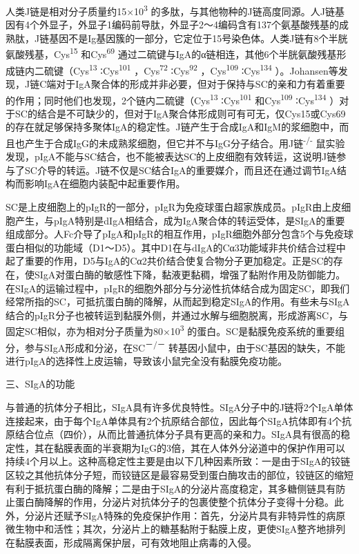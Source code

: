 人类J链是相对分子质量约15×10\textsuperscript{3}
的多肽，与其他物种的J链高度同源。人J链基因有4个外显子，外显子1编码前导肽，外显子2～4编码含有137个氨基酸残基的成熟肽，J链基因不是Ig基因簇的一部分，它定位于15号染色体。人类J链有8个半胱氨酸残基，Cys\textsuperscript{15}
和Cys\textsuperscript{69}
通过二硫键与IgA的α链相连，其他6个半胱氨酸残基形成链内二硫键（Cys\textsuperscript{13}
∶Cys\textsuperscript{101} ，Cys\textsuperscript{72}
∶Cys\textsuperscript{92} ，Cys\textsuperscript{109}
∶Cys\textsuperscript{134}
）。Johansen等发现，J链C端对于IgA聚合体的形成并非必要，但对于保持与SC的亲和力有着重要的作用；同时他们也发现，2个链内二硫键（Cys\textsuperscript{13}
∶Cys\textsuperscript{101} 和Cys\textsuperscript{109}
∶Cys\textsuperscript{134}
）对于SC的结合是不可缺少的，但对于IgA聚合体形成则可有可无，仅Cys15或Cys69的存在就足够保持多聚体IgA的稳定性。J链产生于合成IgA和IgM的浆细胞中，而且也产生于合成IgG的未成熟浆细胞，但它并不与IgG分子结合。用J链\textsuperscript{-/-}
鼠实验发现，pIgA不能与SC结合，也不能被表达SC的上皮细胞有效转运，这说明J链参与了SC介导的转运。J链不仅是SC结合IgA的重要媒介，而且还在通过调节IgA结构而影响IgA在细胞内装配中起重要作用。

SC是上皮细胞上的pIgR的一部分，pIgR为免疫球蛋白超家族成员。pIgR由上皮细胞产生，与pIgA特别是dIgA相结合，成为IgA聚合体的转运受体，是SIgA的重要组成部分。人Fc介导了pIgA和pIgR的相互作用，pIgR细胞外部分包含5个与免疫球蛋白相似的功能域（D1～D5）。其中D1在与dIgA的Cα3功能域非共价结合过程中起了重要的作用，D5与IgA的Cα2共价结合使复合物分子更加稳定。正是SC的存在，使SIgA对蛋白酶的敏感性下降，黏液更黏稠，增强了黏附作用及防御能力。在SIgA的运输过程中，pIgR的细胞外部分与分泌性抗体结合成为固定SC，即我们经常所指的SC，可抵抗蛋白酶的降解，从而起到稳定SIgA的作用。有些未与SIgA结合的pIgR分子也被转运到黏膜外侧，并通过水解与细胞脱离，形成游离SC，与固定SC相似，亦为相对分子质量为80×10\textsuperscript{3}
的蛋白。SC是黏膜免疫系统的重要组分，参与SIgA形成和分泌，在SC\textsuperscript{－/－}
转基因小鼠中，由于SC基因的缺失，不能进行pIgA的选择性上皮运输，导致该小鼠完全没有黏膜免疫功能。

\begin{center}
{\large 三、SIgA的功能}
\end{center}
与普通的抗体分子相比，SIgA具有许多优良特性。SIgA分子中的J链将2个IgA单体连接起来，由于每个IgA单体具有2个抗原结合部位，因此每个SIgA抗体即有4个抗原结合位点（四价），从而比普通抗体分子具有更高的亲和力。SIgA具有很高的稳定性，其在黏膜表面的半衰期为IgG的3倍，其在人体外分泌道中的保护作用可以持续4个月以上。这种高稳定性主要是由以下几种因素所致：一是由于SIgA的铰链区较之其他抗体分子短，而铰链区是最容易受到蛋白酶攻击的部位，铰链区的缩短有利于抵抗蛋白酶的降解；二是由于SIgA的分泌片高度稳定，其多糖侧链具有防止蛋白酶降解的作用，分泌片对抗体分子的包裹使整个抗体分子变得十分稳。此外，分泌片还赋予SIgA特殊的免疫保护作用：首先，分泌片具有非特异性的病原微生物中和活性；其次，分泌片上的糖基黏附于黏膜上皮，更使SIgA整齐地排列在黏膜表面，形成隔离保护层，可有效地阻止病毒的入侵。

